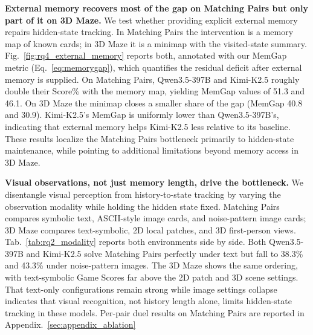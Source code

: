 \documentclass{llmxive}
\begin{document}
\noindent\textbf{External memory recovers most of the gap on Matching Pairs but only part of it on 3D Maze.}
We test whether providing explicit external memory repairs hidden-state tracking. In Matching Pairs the intervention is a memory map of known cards; in 3D Maze it is a minimap with the visited-state summary. Fig.~\ref{fig:rq4_external_memory} reports both, annotated with our MemGap metric (Eq.~\ref{eq:memorygap}), which quantifies the residual deficit after external memory is supplied. On Matching Pairs, Qwen3.5-397B and Kimi-K2.5 roughly double their Score\% with the memory map, yielding MemGap values of 51.3 and 46.1. On 3D Maze the minimap closes a smaller share of the gap (MemGap 40.8 and 30.9). Kimi-K2.5's MemGap is uniformly lower than Qwen3.5-397B's, indicating that external memory helps Kimi-K2.5 less relative to its baseline. These results localize the Matching Pairs bottleneck primarily to hidden-state maintenance, while pointing to additional limitations beyond memory access in 3D Maze.


\noindent\textbf{Visual observations, not just memory length, drive the bottleneck.}
We disentangle visual perception from history-to-state tracking by varying the observation modality while holding the hidden state fixed. Matching Pairs compares symbolic text, ASCII-style image cards, and noise-pattern image cards; 3D Maze compares text-symbolic, 2D local patches, and 3D first-person views. Tab.~\ref{tab:rq2_modality} reports both environments side by side. Both Qwen3.5-397B and Kimi-K2.5 solve Matching Pairs perfectly under text but fall to 38.3\% and 43.3\% under noise-pattern images. The 3D Maze shows the same ordering, with text-symbolic Game Scores far above the 2D patch and 3D scene settings. That text-only configurations remain strong while image settings collapse indicates that visual recognition, not history length alone, limits hidden-state tracking in these models. Per-pair duel results on Matching Pairs are reported in Appendix.~\ref{sec:appendix_ablation}

\end{document}
